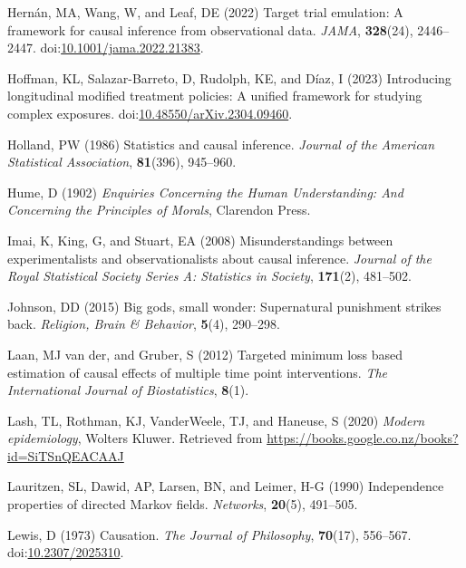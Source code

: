 \documentclass[
  single column]{article}
\newlength{\cslhangindent}
\newenvironment{CSLReferences}[2] %
 {\begin{list}{}{%
  \setlength{\itemindent}{0pt}
  \setlength{\leftmargin}{0pt}
  \setlength{\parsep}{0pt}
  \ifodd #1
   \setlength{\leftmargin}{\cslhangindent}
   \setlength{\itemindent}{-1\cslhangindent}
  \fi
  \setlength{\itemsep}{#2\baselineskip}}}
 {\end{list}}
\begin{document}
\begin{CSLReferences}{1}{0}
Hernán, MA, Wang, W, and Leaf, DE (2022) Target trial emulation: A
framework for causal inference from observational data. \emph{JAMA},
\textbf{328}(24), 2446--2447.
doi:\href{https://doi.org/10.1001/jama.2022.21383}{10.1001/jama.2022.21383}.

Hoffman, KL, Salazar-Barreto, D, Rudolph, KE, and Díaz, I (2023)
Introducing longitudinal modified treatment policies: A unified
framework for studying complex exposures.
doi:\href{https://doi.org/10.48550/arXiv.2304.09460}{10.48550/arXiv.2304.09460}.

Holland, PW (1986) Statistics and causal inference. \emph{Journal of the
American Statistical Association}, \textbf{81}(396), 945--960.

Hume, D (1902) \emph{Enquiries Concerning the Human Understanding: And
Concerning the Principles of Morals}, Clarendon Press.

Imai, K, King, G, and Stuart, EA (2008) Misunderstandings between
experimentalists and observationalists about causal inference.
\emph{Journal of the Royal Statistical Society Series A: Statistics in
Society}, \textbf{171}(2), 481--502.

Johnson, DD (2015) Big gods, small wonder: Supernatural punishment
strikes back. \emph{Religion, Brain \& Behavior}, \textbf{5}(4),
290--298.

Laan, MJ van der, and Gruber, S (2012) Targeted minimum loss based
estimation of causal effects of multiple time point interventions.
\emph{The International Journal of Biostatistics}, \textbf{8}(1).

Lash, TL, Rothman, KJ, VanderWeele, TJ, and Haneuse, S (2020)
\emph{Modern epidemiology}, Wolters Kluwer. Retrieved from
\url{https://books.google.co.nz/books?id=SiTSnQEACAAJ}

Lauritzen, SL, Dawid, AP, Larsen, BN, and Leimer, H-G (1990)
Independence properties of directed {M}arkov fields. \emph{Networks},
\textbf{20}(5), 491--505.

Lewis, D (1973) Causation. \emph{The Journal of Philosophy},
\textbf{70}(17), 556--567.
doi:\href{https://doi.org/10.2307/2025310}{10.2307/2025310}.


\end{CSLReferences}
\end{document}
